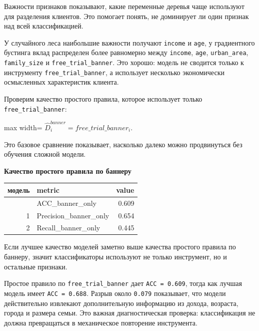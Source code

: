\documentclass[11pt]{article}
\newcounter{none}
\begin{document}
    Важности признаков показывают, какие переменные деревья чаще используют
для разделения клиентов. Это помогает понять, не доминирует ли один
признак над всей классификацией.

У случайного леса наибольшие важности получают \texttt{income} и
\texttt{age}, у градиентного бустинга вклад распределен более равномерно
между \texttt{income}, \texttt{age}, \texttt{urban\_area},
\texttt{family\_size} и \texttt{free\_trial\_banner}. Это хорошо: модель
не сводится только к инструменту \texttt{free\_trial\_banner}, а
использует несколько экономически осмысленных характеристик клиента.

    Проверим качество простого правила, которое использует только
\texttt{free\_trial\_banner}:

\begin{center}
\begin{adjustbox}{max width=\linewidth}
\(\displaystyle \hat D_i^{banner} = free\_trial\_banner_i.\)
\end{adjustbox}
\end{center}

Это базовое сравнение показывает, насколько далеко можно продвинуться
без обучения сложной модели.

    \textbf{Качество простого правила по баннеру}

{\def\LTcaptype{none} %
\begin{longtable}[]{@{}rlr@{}}
\toprule\noalign{}
модель & metric & value \\
\midrule\noalign{}
\endhead
\bottomrule\noalign{}
\endlastfoot
0 & ACC\_banner\_only & 0.609 \\
1 & Precision\_banner\_only & 0.654 \\
2 & Recall\_banner\_only & 0.445 \\
\end{longtable}
}

    Если лучшее качество моделей заметно выше качества простого правила по
баннеру, значит классификаторы используют не только инструмент, но и
остальные признаки.

Простое правило по \texttt{free\_trial\_banner} дает
\texttt{ACC\ =\ 0.609}, тогда как лучшая модель имеет
\texttt{ACC\ =\ 0.688}. Разрыв около \texttt{0.079} показывает, что
модели действительно извлекают дополнительную информацию из дохода,
возраста, города и размера семьи. Это важная диагностическая проверка:
классификация не должна превращаться в механическое повторение
инструмента.
\end{document}
